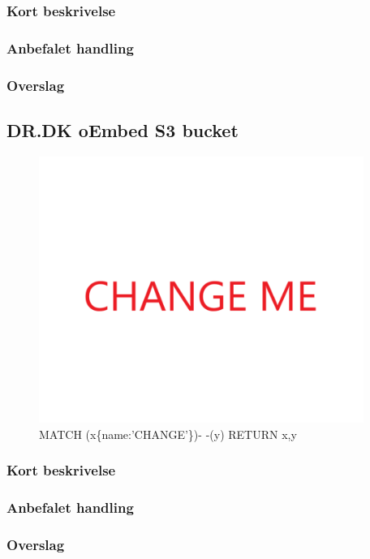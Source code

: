 \documentclass{article}
\begin{document}
\subsubsection{Kort beskrivelse}
\subsubsection{Anbefalet handling}
\subsubsection{Overslag}
\subsection{DR.DK oEmbed S3 bucket}
\begin{figure}[h]
\includegraphics[width=300pt]{CHANGE.PNG}
\caption{MATCH (x\{name:'CHANGE'\})- -(y) RETURN x,y}
\end{figure}
\subsubsection{Kort beskrivelse}
\subsubsection{Anbefalet handling}
\subsubsection{Overslag}
\end{document}
